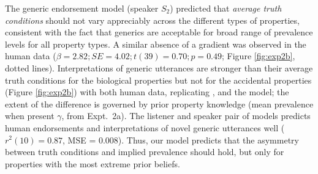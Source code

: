 \documentclass[12pt,letterpaper]{article}
\newcommand{\ndg}[1]{\textcolor{Green}{[ndg: #1]}}
\newcommand{\mht}[1]{\textcolor{Blue}{[mht: #1]}}
\begin{document}
The generic endorsement model (speaker $S_2$) predicted that \emph{average truth conditions} should not vary appreciably across the different types of properties, consistent with the fact that generics are acceptable for broad range of prevalence levels for all property types.
A similar absence of a gradient was observed in the human data ($\beta = 2.82; SE = 4.02; t(39) = 0.70; p = 0.49$; Figure \ref{fig:exp2b}, dotted lines). 
Interpretations of generic utterances are stronger than their average truth conditions for the biological properties but not for the accidental properties (Figure \ref{fig:exp2b}) with both human data, replicating , and the model; the extent of the difference is governed by prior property knowledge (mean prevalence when present $\gamma$, from Expt.~2a).
The listener and speaker pair of models predicts human endorsements and interpretations of novel generic utterances well ($r^2(10) = 0.87$, MSE = 0.008).
Thus, our model predicts that the asymmetry between truth conditions and implied prevalence should hold, but only for properties with the most extreme prior beliefs.
%
%
%
\end{document}
